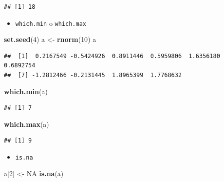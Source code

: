 \documentclass[]{book}
\newenvironment{Shaded}{\begin{snugshade}}{\end{snugshade}}
\newcommand{\KeywordTok}[1]{\textcolor[rgb]{0.13,0.29,0.53}{\textbf{#1}}}
\newcommand{\DecValTok}[1]{\textcolor[rgb]{0.00,0.00,0.81}{#1}}
\newcommand{\StringTok}[1]{\textcolor[rgb]{0.31,0.60,0.02}{#1}}
\newcommand{\OtherTok}[1]{\textcolor[rgb]{0.56,0.35,0.01}{#1}}
\newcommand{\NormalTok}[1]{#1}
\providecommand{\tightlist}{%
  \setlength{\itemsep}{0pt}\setlength{\parskip}{0pt}}
\begin{document}
\begin{verbatim}
## [1] 18
\end{verbatim}

\begin{itemize}
\tightlist
\item
  \texttt{which.min} o \texttt{which.max}
\end{itemize}

\begin{Shaded}
\begin{Highlighting}[]
\KeywordTok{set.seed}\NormalTok{(}\DecValTok{4}\NormalTok{)}
\NormalTok{a <-}\StringTok{ }\KeywordTok{rnorm}\NormalTok{(}\DecValTok{10}\NormalTok{)}
\NormalTok{a}
\end{Highlighting}
\end{Shaded}

\begin{verbatim}
##  [1]  0.2167549 -0.5424926  0.8911446  0.5959806  1.6356180  0.6892754
##  [7] -1.2812466 -0.2131445  1.8965399  1.7768632
\end{verbatim}

\begin{Shaded}
\begin{Highlighting}[]
\KeywordTok{which.min}\NormalTok{(a)}
\end{Highlighting}
\end{Shaded}

\begin{verbatim}
## [1] 7
\end{verbatim}

\begin{Shaded}
\begin{Highlighting}[]
\KeywordTok{which.max}\NormalTok{(a)}
\end{Highlighting}
\end{Shaded}

\begin{verbatim}
## [1] 9
\end{verbatim}

\begin{itemize}
\tightlist
\item
  \texttt{is.na}
\end{itemize}

\begin{Shaded}
\begin{Highlighting}[]
\NormalTok{ a[}\DecValTok{2}\NormalTok{] <-}\StringTok{ }\OtherTok{NA}
\KeywordTok{is.na}\NormalTok{(a)}
\end{Highlighting}
\end{Shaded}
\end{document}
